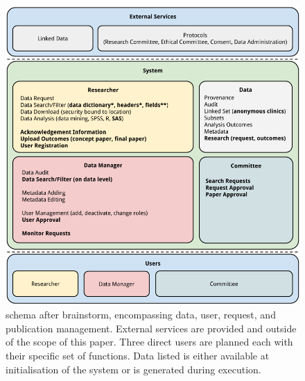 \begin{figure}[!h]
	\centering
	\includegraphics[width=1.0\linewidth]{images/brainstorm-after}
	\caption{
		\ivfsystem{} schema after brainstorm, encompassing data, user, request, and publication management.
		External services are provided and outside of the scope of this paper.
		Three direct users are planned each with their specific set of functions.
		Data listed is either available at initialisation of the system or is generated during execution.
	}
	\label{fig:brainstorm-after}
\end{figure}
